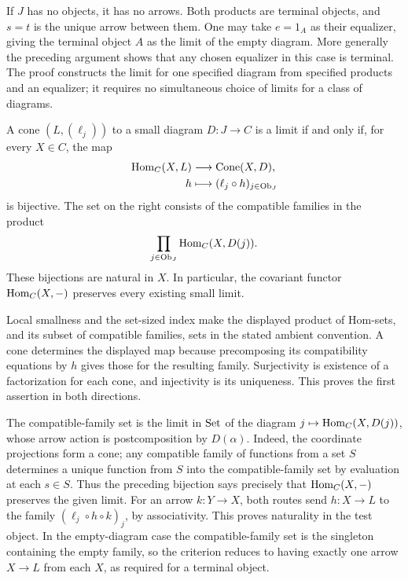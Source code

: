 If $J$ has no objects, it has no arrows. Both products are terminal
objects, and $s=t$ is the unique arrow between them. One may take
$e=1_A$ as their equalizer, giving the terminal object $A$ as the
limit of the empty diagram. More generally the preceding argument
shows that any chosen equalizer in this case is terminal.
The proof constructs the limit for one specified diagram from specified
products and an equalizer; it requires no simultaneous choice of limits
for a class of diagrams.
\Done

\begin{proposition}
\label{prop:hom_small_limits}
A cone $(L,(\ell_j))$ to a small diagram $D:J\to C$ is a limit
if and only if, for every $X\in C$, the map
\[
\begin{split}
{\textrm{Hom}}_C(X,L)&\longrightarrow\operatorname{Cone}(X,D),\\
h&\longmapsto(\ell_j\circ h)_{j\in{\textrm{Ob}}_J}
\end{split}
\]
is bijective. The set on the right consists of the compatible families
in the product
\[
\prod_{j\in{\textrm{Ob}}_J}{\textrm{Hom}}_C(X,D(j)).
\]
These bijections are natural in $X$. In particular, the covariant
functor ${\textrm{Hom}}_C(X,-)$ preserves every existing small limit.
\end{proposition}
\Proof
Local smallness and the set-sized index make the displayed product
of Hom-sets, and its subset of compatible families, sets in the stated
ambient convention. A cone determines the displayed map because
precomposing its compatibility equations by $h$ gives those for the
resulting family. Surjectivity is existence of a factorization for
each cone, and injectivity is its uniqueness. This proves the first
assertion in both directions.

The compatible-family set is the limit in ${\textrm{Set}}$ of the diagram
$j\mapsto{\textrm{Hom}}_C(X,D(j))$, whose arrow action is postcomposition by
$D(\alpha)$. Indeed, the coordinate projections form a cone; any
compatible family of functions from a set $S$ determines a unique
function from $S$ into the compatible-family set by evaluation at each
$s\in S$. Thus the preceding bijection says precisely that
${\textrm{Hom}}_C(X,-)$ preserves the given limit.
For an arrow $k:Y\to X$, both routes send $h:X\to L$ to the
family $(\ell_j\circ h\circ k)_j$, by associativity. This proves
naturality in the test object. In the empty-diagram case the
compatible-family set is the singleton containing the empty family,
so the criterion reduces to having exactly one arrow $X\to L$
from each $X$, as required for a terminal object.
\Done

